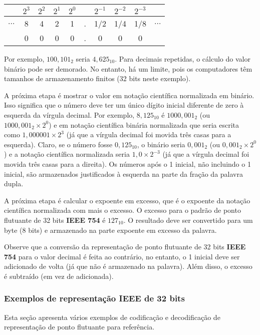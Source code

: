 \vspace{5mm}
\begin{center}
	\begin{tabular}{|c|c|c|c|c|c|c|c|c|c|}
	\hline
	         &$2^3$& $2^2$ & $2^1$ & $2^0$ & & $2^{-1}$  & $2^{-2}$ & $2^{-3}$ & \\ \hline
	$\ldots$ & 8   & 4     & 2     & 1     &.& 1/2       &  1/4     & 1/8 & $\ldots$\\ \hline
	         & 0   & 0     & 0     & 0     &.& 0         &  0     & 0 & \\ \hline
\end{tabular}
\end{center}
\vspace{5mm}

Por exemplo, $ 100,101_2 $ seria $ 4,625_{10} $. Para decimais repetidas, o cálculo do valor binário pode ser demorado. No entanto, há um limite, pois os computadores têm tamanhos de armazenamento finitos (32 bits neste exemplo).

A próxima etapa é mostrar o valor em notação científica normalizada em binário. Isso significa que o número deve ter um único dígito inicial diferente de zero à esquerda da vírgula decimal. Por exemplo, $ 8,125_{10} $ é $ 1000,001_2 $ (ou $ 1000,001_2 \times 2^0$) e em notação científica binária normalizada que seria escrita como $ 1,000001 \times 2^3 $ (já que a vírgula decimal foi movida três casas para a esquerda). Claro, se o número fosse $ 0,125_{10} $, o binário seria $ 0,001_2 $ (ou $ 0,001_2 \times 2^0 $) e a notação científica normalizada seria $ 1,0 \times 2^{-3} $ (já que a vírgula decimal foi movida três casas para a direita). Os números após o 1 inicial, não incluindo o 1 inicial, são armazenados justificados à esquerda na parte da fração da palavra dupla.

A próxima etapa é calcular o expoente em excesso, que é o expoente da notação científica normalizada com mais o excesso. O excesso para o padrão de ponto flutuante de 32 bits \textbf{IEEE 754} é $ 127_{10} $. O resultado deve ser convertido para um byte (8 bits) e armazenado na parte expoente em excesso da palavra.

Observe que a conversão da representação de ponto flutuante de 32 bits \textbf{IEEE 754} para o valor decimal é feita ao contrário, no entanto, o 1 inicial deve ser adicionado de volta (já que não é armazenado na palavra). Além disso, o excesso é subtraído (em vez de adicionada).

\subsubsection{Exemplos de representação IEEE de 32 bits}
Esta seção apresenta vários exemplos de codificação e decodificação de representação de ponto flutuante para referência.

